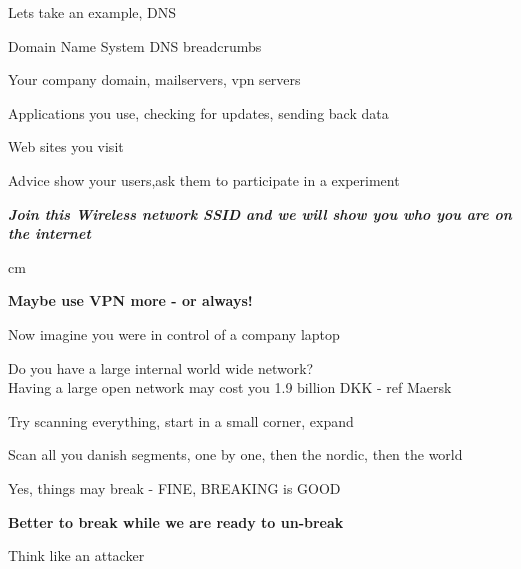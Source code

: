 \documentclass[Screen16to9,17pt,footrule]{foils}
\begin{document}

\begin{list1}
\item Lets take an example, DNS
\item Domain Name System DNS breadcrumbs
\begin{list2}
\item Your company domain, mailservers, vpn servers
\item Applications you use, checking for updates, sending back data
\item Web sites you visit
\end{list2}
\vskip 1cm
\item Advice show your users,ask them to participate in a experiment
\end{list1}

\emph{\bf Join this Wireless network SSID and we will show you who you are on the internet}

 cm
\centerline{\bf\Large Maybe use VPN more - or always!}








\begin{list2}
\item Now imagine you were in control of a company laptop
\item Do you have a large internal world wide network?\\
Having a large open network may cost you 1.9 billion DKK - ref Maersk
\item Try scanning everything, start in a small corner, expand
\item Scan all you danish segments, one by one, then the nordic, then the world
\item Yes, things may break - FINE, BREAKING is GOOD
\end{list2}

\centerline{\bf Better to break while we are ready to un-break}


Think like an attacker
\end{document}
